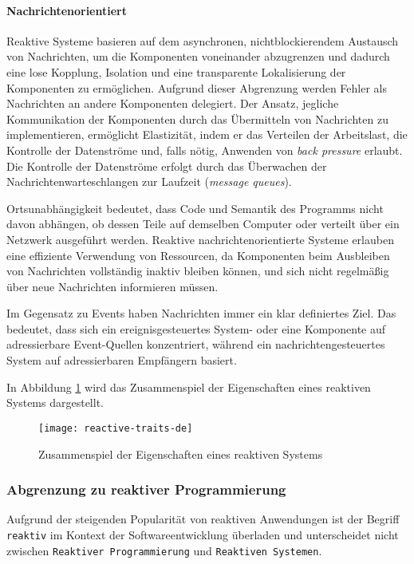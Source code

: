 \paragraph{Nachrichtenorientiert}Reaktive Systeme basieren auf dem asynchronen, nichtblockierendem Austausch von Nachrichten, um die Komponenten voneinander
abzugrenzen und dadurch eine lose Kopplung, Isolation und eine transparente Lokalisierung der Komponenten zu ermöglichen.
Aufgrund dieser Abgrenzung werden Fehler als Nachrichten an andere Komponenten delegiert.
Der Ansatz, jegliche Kommunikation der Komponenten durch das Übermitteln von Nachrichten zu implementieren, ermöglicht Elastizität,
indem er das Verteilen der Arbeitslast, die Kontrolle der Datenströme und, falls nötig, Anwenden von \textit{back pressure} erlaubt.
Die Kontrolle der Datenströme erfolgt durch das Überwachen der Nachrichtenwarteschlangen zur Laufzeit (\textit{message queues}).

Ortsunabhängigkeit bedeutet, dass Code und Semantik des Programms nicht davon abhängen, ob dessen Teile auf demselben Computer
oder verteilt über ein Netzwerk ausgeführt werden.
Reaktive nachrichtenorientierte Systeme erlauben eine effiziente Verwendung von Ressourcen, da Komponenten beim Ausbleiben von
Nachrichten vollständig inaktiv bleiben können, und sich nicht regelmäßig über neue Nachrichten informieren müssen.\parencite{ReactiveSystems}

Im Gegensatz zu Events haben Nachrichten immer ein klar definiertes Ziel.
Das bedeutet, dass sich ein ereignisgesteuertes System- oder eine Komponente auf adressierbare Event-Quellen konzentriert,
während ein nachrichtengesteuertes System auf adressierbaren Empfängern basiert.

In Abbildung \ref{fig:reactive-traits} wird das Zusammenspiel der Eigenschaften eines reaktiven Systems dargestellt.

\begin{figure}[ht!]
  \centering
  \texttt{[image: reactive-traits-de]}
  \caption{Zusammenspiel der Eigenschaften eines reaktiven Systems \parencite{ReactiveSystems}}
  \label{fig:reactive-traits}
\end{figure}
\newpage
\subsubsection{Abgrenzung zu reaktiver Programmierung}
\label{subsubsection:abgrenzung_reaktive_programmierung}
Aufgrund der steigenden Popularität von reaktiven Anwendungen ist der Begriff \verb|reaktiv| im Kontext der Softwareentwicklung
überladen und unterscheidet nicht zwischen \linebreak\verb|Reaktiver Programmierung| und \verb|Reaktiven Systemen|.

